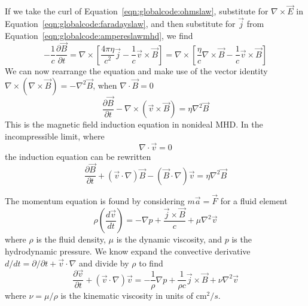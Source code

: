 \documentclass[letterpaper]{article}
\begin{document}
If we take the curl of Equation~\ref{eqn:globalcode:ohmslaw},
substitute for $\nabla\times\vec{E}$ in
Equation~\ref{eqn:globalcode:faradayslaw}, and then substitute for
$\vec{j}$ from Equation~\ref{eqn:globalcode:ampereslawmhd}, we find
\begin{equation}
-\frac{1}{c}\frac{\partial\vec{B}}{\partial t} = 
\nabla\times\left[\frac{4\pi\eta}{c^2}\vec{j} 
                  - \frac{1}{c}\vec{v}\times\vec{B}\right]
= \nabla\times\left[\frac{\eta}{c}\nabla\times\vec{B} 
                    - \frac{1}{c}\vec{v}\times\vec{B}\right]
\end{equation}
We can now rearrange the equation and make use of the vector identity
$\nabla\times(\nabla\times\vec{B}) = -\nabla^2\vec{B}$, when
$\nabla\cdot\vec{B}=0$
\begin{equation}
\frac{\partial\vec{B}}{\partial t} 
- \nabla\times\left(\vec{v}\times\vec{B}\right)
= \eta \nabla^2 \vec{B}
\label{eqn:globalcode:inductionequation}
\end{equation}
This is the magnetic field induction equation in nonideal MHD. In the
incompressible limit, where
\begin{equation}
\nabla\cdot\vec{v}=0
\label{eqn:globalcode:incompressibility}
\end{equation}
the induction equation can be rewritten
\begin{equation}
\frac{\partial\vec{B}}{\partial t} + (\vec{v}\cdot\nabla)\vec{B}
- (\vec{B}\cdot\nabla)\vec{v}
= \eta \nabla^2 \vec{B}
\label{eqn:globalcode:incompressibleinductionequation}
\end{equation}

The momentum equation is found by considering $m\vec{a} = \vec{F}$
for a fluid element
\begin{equation}
\rho\left(\frac{d\vec{v}}{dt}\right) = -\nabla p 
 + \frac{\vec{j}\times\vec{B}}{c} + \mu\nabla^2 \vec{v}
\end{equation}
where $\rho$ is the fluid density, $\mu$ is the dynamic viscosity, and
$p$ is the hydrodynamic pressure. We know expand the convective
derivative $d/dt = \partial/\partial t + \vec{v}\cdot\nabla$ and
divide by $\rho$ to find
\begin{equation}
\frac{\partial\vec{v}}{\partial t} + \left(\vec{v}\cdot \nabla\right)\vec{v}
 = -\frac{1}{\rho}\nabla p + \frac{1}{\rho c}\vec{j}\times\vec{B} 
 + \nu\nabla^2 \vec{v}
\end{equation}
where $\nu = \mu/\rho$ is the kinematic viscosity in units of cm$^2/s$.
\end{document}
